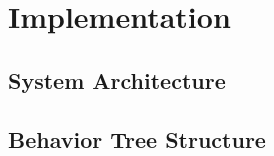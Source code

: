\chapter{Implementation}
\label{cha:implementierung}

\section{System Architecture}

\section{Behavior Tree Structure}

